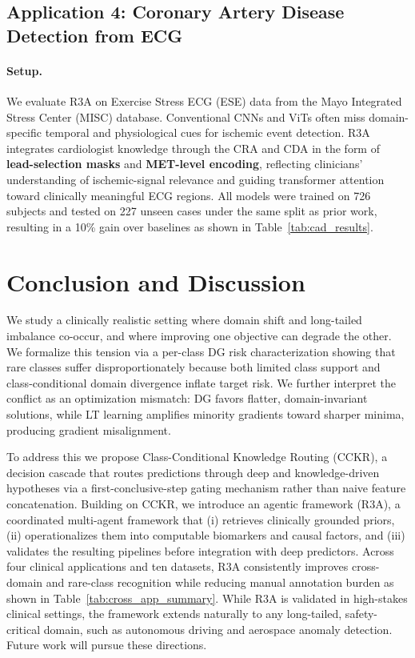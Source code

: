 \documentclass{article}
\begin{document}
\subsection{Application 4: Coronary Artery Disease Detection from ECG}

\paragraph{Setup.}
We evaluate R3A on Exercise Stress ECG (ESE) data from the Mayo Integrated
Stress Center (MISC) database. Conventional CNNs and ViTs often miss
domain-specific temporal and physiological cues for ischemic event
detection. R3A integrates cardiologist knowledge through the CRA and CDA
in the form of \textbf{lead-selection masks} and \textbf{MET-level
encoding}, reflecting clinicians' understanding of ischemic-signal
relevance and guiding transformer attention toward clinically meaningful
ECG regions. All models were trained on 726 subjects and tested on 227
unseen cases under the same split as prior work, resulting in a 10\%
gain over baselines as shown in Table~\ref{tab:cad_results}.


\section{Conclusion and Discussion}
\label{sec:conclusion}

We study a clinically realistic setting where domain shift and long-tailed
imbalance co-occur, and where improving one objective can degrade the
other. We formalize this tension via a per-class DG risk characterization
showing that rare classes suffer disproportionately because both limited
class support and class-conditional domain divergence inflate target
risk. We further interpret the conflict as an optimization mismatch: DG
favors flatter, domain-invariant solutions, while LT learning amplifies
minority gradients toward sharper minima, producing gradient
misalignment.

To address this we propose Class-Conditional Knowledge Routing (CCKR),
a decision cascade that routes predictions through deep and
knowledge-driven hypotheses via a first-conclusive-step gating mechanism
rather than naive feature concatenation. Building on CCKR, we introduce
an agentic framework (R3A), a coordinated multi-agent framework
that (i) retrieves clinically grounded priors, (ii) operationalizes them
into computable biomarkers and causal factors, and (iii) validates the
resulting pipelines before integration with deep predictors. Across four
clinical applications and ten datasets, R3A consistently improves
cross-domain and rare-class recognition while reducing manual annotation
burden as shown in Table~\ref{tab:cross_app_summary}. While R3A is validated in high-stakes clinical settings, the framework extends
naturally to any long-tailed, safety-critical domain, such as autonomous driving
and aerospace anomaly detection. Future work will pursue these directions.
\end{document}
